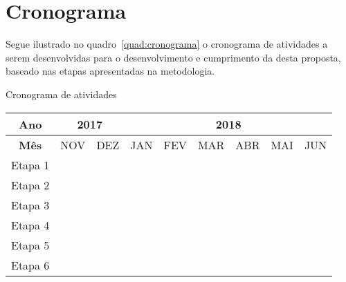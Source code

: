 
\chapter{Cronograma}

Segue ilustrado no quadro~\ref{quad:cronograma} o cronograma de atividades a serem desenvolvidas para o desenvolvimento e cumprimento da desta proposta, baseado nas etapas apresentadas na metodologia.


\begin{quadro}[!htb]
	\caption{Cronograma de atividades}\label{quad:cronograma}
	\centering
	\begin{tabular}{|c|c|c|c|c|c|c|c|c|}
		\hline
		\multicolumn{1}{|c}{\textbf{Ano}} & \multicolumn{2}{|c|}{2017} & \multicolumn{6}{c|}{2018}\\
		\hline
		\multicolumn{1}{|c|}{\textbf{M\^es}} & NOV & DEZ & JAN & FEV & MAR & ABR & MAI & JUN\\
		\hline
		\multicolumn{1}{|l|}{Etapa 1} & \multicolumn{1}{|c|}{\cellcolor{gray}} & \multicolumn{1}{|c|}{\cellcolor{gray}} & \multicolumn{1}{|c|}{\cellcolor{gray}} &  & & & &\\
		\hline
		\multicolumn{1}{|l|}{Etapa 2} &  &  & \multicolumn{1}{|c|}{\cellcolor{gray}} & \multicolumn{1}{|c|}{\cellcolor{gray}} & \multicolumn{1}{|c|}{\cellcolor{gray}} & & & \\
		\hline
		\multicolumn{1}{|l|}{Etapa 3} &  &  &  &  & \multicolumn{1}{|l|}{\cellcolor{gray}} & \multicolumn{1}{|l|}{\cellcolor{gray}} & \multicolumn{1}{|l|}{\cellcolor{gray}} &\\
		\hline
		\multicolumn{1}{|l|}{Etapa 4} &  &  &  &  &  & \multicolumn{1}{|l|}{\cellcolor{gray}} & \multicolumn{1}{|l|}{\cellcolor{gray}} &\\
		\hline
		\multicolumn{1}{|l|}{Etapa 5} &  &  &  &\multicolumn{1}{|l|}{\cellcolor{gray}}  &\multicolumn{1}{|l|}{\cellcolor{gray}}  & \multicolumn{1}{|l|}{\cellcolor{gray}} & \multicolumn{1}{|l|}{\cellcolor{gray}} & \multicolumn{1}{|l|}{\cellcolor{gray}}\\
		\hline
		\multicolumn{1}{|l|}{Etapa 6} &  &  &  &  &  &  &  & \multicolumn{1}{|l|}{\cellcolor{gray}}\\
		\hline
	\end{tabular}
\end{quadro}


